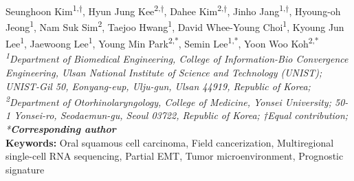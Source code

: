 \begin{center}
Seunghoon Kim\textsuperscript{1,†}, Hyun Jung Kee\textsuperscript{2,†}, Dahee Kim\textsuperscript{2,†}, Jinho Jang\textsuperscript{1,†}, Hyoung-oh Jeong\textsuperscript{1}, Nam Suk Sim\textsuperscript{2}, Taejoo Hwang\textsuperscript{1}, David Whee-Young Choi\textsuperscript{1}, Kyoung Jun Lee\textsuperscript{1}, Jaewoong Lee\textsuperscript{1}, Young Min Park\textsuperscript{2,*}, Semin Lee\textsuperscript{1,*}, Yoon Woo Koh\textsuperscript{2,*} \\
\vspace{0.3cm}
\textit{\textsuperscript{1}Department of Biomedical Engineering, College of Information-Bio Convergence Engineering, Ulsan National Institute of Science and Technology (UNIST); UNIST-Gil 50, Eonyang-eup, Ulju-gun, Ulsan 44919, Republic of Korea; \textsuperscript{2}Department of Otorhinolaryngology, College of Medicine, Yonsei University; 50-1 Yonsei-ro, Seodaemun-gu, Seoul 03722, Republic of Korea; †Equal contribution; *\textbf{Corresponding author}} \\
\vspace{0.3cm}
\textbf{Keywords:} Oral squamous cell carcinoma, Field cancerization, Multiregional single-cell RNA sequencing, Partial EMT, Tumor microenvironment, Prognostic signature
\end{center}

